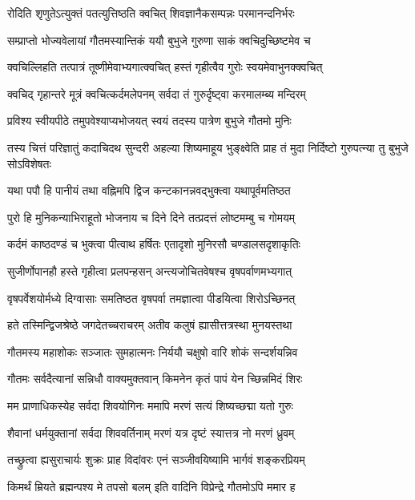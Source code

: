\twolineshloka
{रोदिति शृणुतेऽत्युक्तं पतत्युत्तिष्ठति क्वचित्}
{शिवज्ञानैकसम्पन्नः परमानन्दनिर्भरः}%

\twolineshloka
{सम्प्राप्तो भोज्यवेलायां गौतमस्यान्तिकं ययौ}
{बुभुजे गुरुणा साकं क्वचिदुच्छिष्टमेव च}%

\twolineshloka
{क्वचिल्लिहति तत्पात्रं तूष्णीमेवाभ्यगात्क्वचित्}
{हस्तं गृहीत्वैव गुरोः स्वयमेवाभुनक्क्वचित्}%

\twolineshloka
{क्वचिद् गृहान्तरे मूत्रं क्वचित्कर्दमलेपनम्}
{सर्वदा तं गुरुर्दृष्ट्वा करमालम्ब्य मन्दिरम्}%

\twolineshloka
{प्रविश्य स्वीयपीठे तमुपवेश्याप्यभोजयत्}
{स्वयं तदस्य पात्रेण बुभुजे गौतमो मुनिः}%

\threelineshloka
{तस्य चित्तं परिज्ञातुं कदाचिदथ सुन्दरी}
{अहल्या शिष्यमाहूय भुङ्क्ष्वेति प्राह तं मुदा}
{निर्दिष्टो गुरुपत्न्या तु बुभुजे सोऽविशेषतः}%

\twolineshloka
{यथा पपौ हि पानीयं तथा वह्निमपि द्विज}
{कन्टकानन्नवद्भुक्त्वा यथापूर्वमतिष्ठत}%

\twolineshloka
{पुरो हि मुनिकन्याभिराहूतो भोजनाय च}
{दिने दिने तत्प्रदत्तं लोष्टमम्बु च गोमयम्}%

\twolineshloka
{कर्दमं काष्ठदण्डं च भुक्त्वा पीत्वाथ हर्षितः}
{एतादृशो मुनिरसौ चण्डालसदृशाकृतिः}%

\twolineshloka
{सुजीर्णोपानहौ हस्ते गृहीत्वा प्रलपन्हसन्}
{अन्त्यजोचितवेषश्च वृषपर्वाणमभ्यगात्}%

\twolineshloka
{वृषपर्वेशयोर्मध्ये दिग्वासाः समतिष्ठत}
{वृषपर्वा तमज्ञात्वा पीडयित्वा शिरोऽच्छिनत्}%

\twolineshloka
{हते तस्मिन्द्विजश्रेष्ठे जगदेतच्चराचरम्}
{अतीव कलुषं ह्यासीत्तत्रस्था मुनयस्तथा}%

\twolineshloka
{गौतमस्य महाशोकः सञ्जातः सुमहात्मनः}
{निर्ययौ चक्षुषो वारि शोकं सन्दर्शयन्निव}%

\twolineshloka
{गौतमः सर्वदैत्यानां सन्निधौ वाक्यमुक्तवान्}
{किमनेन कृतं पापं येन च्छिन्नमिदं शिरः}%

\twolineshloka
{मम प्राणाधिकस्येह सर्वदा शिवयोगिनः}
{ममापि मरणं सत्यं शिष्यच्छद्मा यतो गुरुः}%

\twolineshloka
{शैवानां धर्मयुक्तानां सर्वदा शिववर्तिनाम्}
{मरणं यत्र दृष्टं स्यात्तत्र नो मरणं ध्रुवम्}%

\twolineshloka
{तच्छ्रुत्वा ह्यसुराचार्यः शुक्रः प्राह विदांवरः}
{एनं सञ्जीवयिष्यामि भार्गवं शङ्करप्रियम्}%

\twolineshloka
{किमर्थं म्रियते ब्रह्मन्पश्य मे तपसो बलम्}
{इति वादिनि विप्रेन्द्रे गौतमोऽपि ममार ह}%

